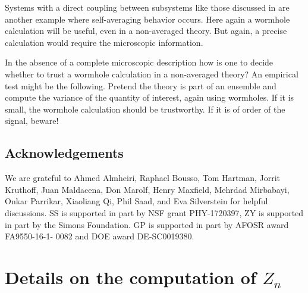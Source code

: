 \documentclass[12pt]{article}
\numberwithin{equation}{section}
\begin{document}
Systems with a direct coupling between subsystems like those  discussed in \cite{Maldacena:2018lmt} are another example where self-averaging behavior occurs.  Here again a wormhole calculation will be  useful, even in a non-averaged theory.  But again, a precise calculation would require the microscopic information.

In the absence of a complete microscopic description how is one to decide whether to trust a wormhole calculation in a non-averaged theory?   An empirical test might be the following.   Pretend the theory is part of an ensemble and compute the variance of the quantity of interest, again using wormholes.  If it is small, the wormhole calculation should be trustworthy.  If it is of order of the signal, beware!




\subsection*{Acknowledgements}
We are grateful to Ahmed Almheiri, Raphael Bousso, Tom Hartman, Jorrit Kruthoff, Juan Maldacena, Don Marolf, Henry Maxfield, Mehrdad Mirbabayi, Onkar Parrikar, Xiaoliang Qi, Phil Saad, and Eva Silverstein for helpful discussions. SS is supported in part by NSF grant PHY-1720397, ZY is supported in part by the Simons Foundation.  GP is supported in part by AFOSR award FA9550-16-1- 0082 and DOE award {DE-SC0019380}.



\appendix

\section{Details on the computation of $Z_n$}\label{app:zn}
\end{document}
